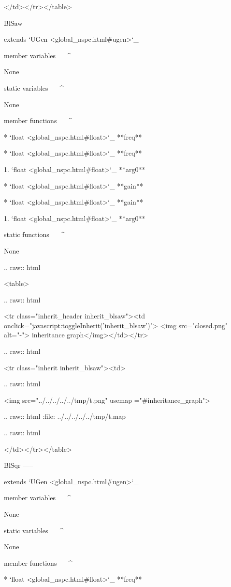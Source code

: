    </td></tr></table>

BlSaw
-----

extends `UGen <global_nspc.html#ugen>`_ 

member variables
^^^^^^^^^^^^^^^^

	None

static variables
^^^^^^^^^^^^^^^^

	None

member functions
^^^^^^^^^^^^^^^^

	* `float <global_nspc.html#float>`_ **freq**

	* `float <global_nspc.html#float>`_ **freq**

		1. `float <global_nspc.html#float>`_ **arg0**

	* `float <global_nspc.html#float>`_ **gain**

	* `float <global_nspc.html#float>`_ **gain**

		1. `float <global_nspc.html#float>`_ **arg0**

static functions
^^^^^^^^^^^^^^^^


	None


  .. raw:: html

   <table>


  .. raw:: html

   <tr class="inherit_header inherit_blsaw"><td onclick="javascript:toggleInherit('inherit_blsaw')"> <img src="closed.png" alt="-"> inheritance graph</img></td></tr>


  .. raw:: html

   <tr class="inherit inherit_blsaw"><td>


  .. raw:: html

   <img src="../../../../../tmp/t.png" usemap ="#inheritance_graph">


  .. raw:: html
   :file:   ../../../../../tmp/t.map


  .. raw:: html

   </td></tr></table>

BlSqr
-----

extends `UGen <global_nspc.html#ugen>`_ 

member variables
^^^^^^^^^^^^^^^^

	None

static variables
^^^^^^^^^^^^^^^^

	None

member functions
^^^^^^^^^^^^^^^^

	* `float <global_nspc.html#float>`_ **freq**

